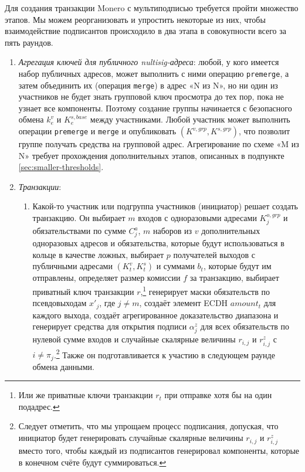Для создания транзакции Monero с мультиподписью требуется пройти множество этапов. Мы можем реорганизовать и упростить некоторые из них, чтобы взаимодействие подписантов происходило в два этапа в совокупности всего за пять раундов.
\begin{enumerate}
    \item {\it Агрегация ключей для публичного nultisig-адреса}: любой, у кого имеется набор публич\-ных адресов, может выполнить с ними операцию {\tt premerge}, а затем объединить их (операция {\tt merge}) в адрес «N из N», но ни один из участников не будет знать групповой ключ просмотра до тех пор, пока не узнает все компоненты. Поэтому создание группы начинается с безопасного обмена $k^{v}_e$ и $K^{s,base}_e$ между участниками. Любой участник может выполнить операции {\tt premerge} и {\tt merge} и опубликовать $(K^{v,grp},K^{s,grp})$, что позво\-лит группе получать средства на групповой адрес. Агрегирование по схеме «M из N» требует прохождения дополнительных этапов, описанных в подпункте \ref{sec:smaller-thresholds}.
    \item {\it Транзакции}:
    \begin{enumerate}
        \item Какой-то участник или подгруппа участников (инициатор) решает создать транзак\-цию. Он выбирает $m$ входов с одноразовыми адресами $K^{o,grp}_{j}$ и обязательствами по сумме $C^a_j$, $m$ наборов из $v$ дополнительных одноразовых адресов и обязательства, которые будут использоваться в кольце в качестве ложных, выбирает $p$ получателей выходов с публичными адресами $(K^v_t,K^s_t)$ и суммами $b_t$, которые будут им отправ\-лены, определяет размер комиссии $f$ за транзакцию, выбирает приватный ключ транзакции $r$,\footnote{Или же приватные ключи транзакции $r_{t}$ при отправке хотя бы на один подадрес.} генерирует маски обязательств по псевдовыходам $x'_{j}$, где $j \neq m$, создаёт элемент ECDH $\mathit{amount}_t$ для каждого выхода, создаёт агрегированное доказательство диапазона и генерирует средства для открытия подписи $\alpha^z_j$ для всех обязательств по нулевой сумме входов и случайные скалярные величины $r_{i,j}$ и $r^z_{i,j}$ с $i \neq \pi_j$.\footnote{Следует отметить, что мы упрощаем процесс подписания, допуская, что инициатор будет генерировать случайные скалярные величины $r_{i,j}$ и $r^z_{i,j}$ вместо того, чтобы каждый из подписантов генерировал компоненты, которые в конечном счёте будут суммироваться.} Также он подготавливается к участию в следующем раунде обмена данными.\\


\end{enumerate}
\end{enumerate}
